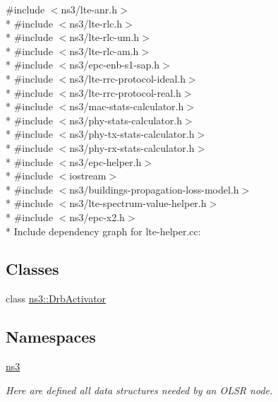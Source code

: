 {\ttfamily \#include $<$ns3/lte-\/anr.\+h$>$}\\*
{\ttfamily \#include $<$ns3/lte-\/rlc.\+h$>$}\\*
{\ttfamily \#include $<$ns3/lte-\/rlc-\/um.\+h$>$}\\*
{\ttfamily \#include $<$ns3/lte-\/rlc-\/am.\+h$>$}\\*
{\ttfamily \#include $<$ns3/epc-\/enb-\/s1-\/sap.\+h$>$}\\*
{\ttfamily \#include $<$ns3/lte-\/rrc-\/protocol-\/ideal.\+h$>$}\\*
{\ttfamily \#include $<$ns3/lte-\/rrc-\/protocol-\/real.\+h$>$}\\*
{\ttfamily \#include $<$ns3/mac-\/stats-\/calculator.\+h$>$}\\*
{\ttfamily \#include $<$ns3/phy-\/stats-\/calculator.\+h$>$}\\*
{\ttfamily \#include $<$ns3/phy-\/tx-\/stats-\/calculator.\+h$>$}\\*
{\ttfamily \#include $<$ns3/phy-\/rx-\/stats-\/calculator.\+h$>$}\\*
{\ttfamily \#include $<$ns3/epc-\/helper.\+h$>$}\\*
{\ttfamily \#include $<$iostream$>$}\\*
{\ttfamily \#include $<$ns3/buildings-\/propagation-\/loss-\/model.\+h$>$}\\*
{\ttfamily \#include $<$ns3/lte-\/spectrum-\/value-\/helper.\+h$>$}\\*
{\ttfamily \#include $<$ns3/epc-\/x2.\+h$>$}\\*
Include dependency graph for lte-\/helper.cc\+:
\subsection*{Classes}
\begin{DoxyCompactItemize}
\item 
class \hyperlink{classns3_1_1DrbActivator}{ns3\+::\+Drb\+Activator}
\end{DoxyCompactItemize}
\subsection*{Namespaces}
\begin{DoxyCompactItemize}
\item 
 \hyperlink{namespacens3}{ns3}
\begin{DoxyCompactList}\small\item\em Here are defined all data structures needed by an O\+L\+SR node. \end{DoxyCompactList}\end{DoxyCompactItemize}
